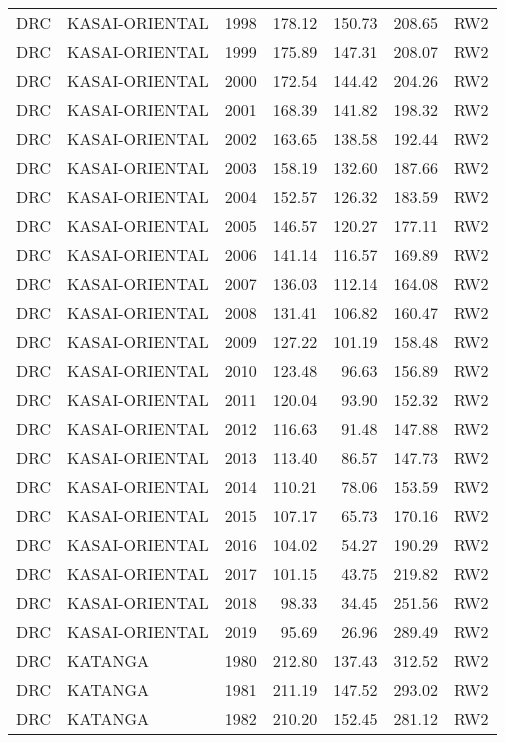 \begin{longtable}{lllrrrl}
  DRC & KASAI-ORIENTAL & 1998 & 178.12 & 150.73 & 208.65 & RW2 \\ 
  DRC & KASAI-ORIENTAL & 1999 & 175.89 & 147.31 & 208.07 & RW2 \\ 
  DRC & KASAI-ORIENTAL & 2000 & 172.54 & 144.42 & 204.26 & RW2 \\ 
  DRC & KASAI-ORIENTAL & 2001 & 168.39 & 141.82 & 198.32 & RW2 \\ 
  DRC & KASAI-ORIENTAL & 2002 & 163.65 & 138.58 & 192.44 & RW2 \\ 
  DRC & KASAI-ORIENTAL & 2003 & 158.19 & 132.60 & 187.66 & RW2 \\ 
  DRC & KASAI-ORIENTAL & 2004 & 152.57 & 126.32 & 183.59 & RW2 \\ 
  DRC & KASAI-ORIENTAL & 2005 & 146.57 & 120.27 & 177.11 & RW2 \\ 
  DRC & KASAI-ORIENTAL & 2006 & 141.14 & 116.57 & 169.89 & RW2 \\ 
  DRC & KASAI-ORIENTAL & 2007 & 136.03 & 112.14 & 164.08 & RW2 \\ 
  DRC & KASAI-ORIENTAL & 2008 & 131.41 & 106.82 & 160.47 & RW2 \\ 
  DRC & KASAI-ORIENTAL & 2009 & 127.22 & 101.19 & 158.48 & RW2 \\ 
  DRC & KASAI-ORIENTAL & 2010 & 123.48 & 96.63 & 156.89 & RW2 \\ 
  DRC & KASAI-ORIENTAL & 2011 & 120.04 & 93.90 & 152.32 & RW2 \\ 
  DRC & KASAI-ORIENTAL & 2012 & 116.63 & 91.48 & 147.88 & RW2 \\ 
  DRC & KASAI-ORIENTAL & 2013 & 113.40 & 86.57 & 147.73 & RW2 \\ 
  DRC & KASAI-ORIENTAL & 2014 & 110.21 & 78.06 & 153.59 & RW2 \\ 
  DRC & KASAI-ORIENTAL & 2015 & 107.17 & 65.73 & 170.16 & RW2 \\ 
  DRC & KASAI-ORIENTAL & 2016 & 104.02 & 54.27 & 190.29 & RW2 \\ 
  DRC & KASAI-ORIENTAL & 2017 & 101.15 & 43.75 & 219.82 & RW2 \\ 
  DRC & KASAI-ORIENTAL & 2018 & 98.33 & 34.45 & 251.56 & RW2 \\ 
  DRC & KASAI-ORIENTAL & 2019 & 95.69 & 26.96 & 289.49 & RW2 \\ 
  DRC & KATANGA & 1980 & 212.80 & 137.43 & 312.52 & RW2 \\ 
  DRC & KATANGA & 1981 & 211.19 & 147.52 & 293.02 & RW2 \\ 
  DRC & KATANGA & 1982 & 210.20 & 152.45 & 281.12 & RW2 \\ 

\end{longtable}
